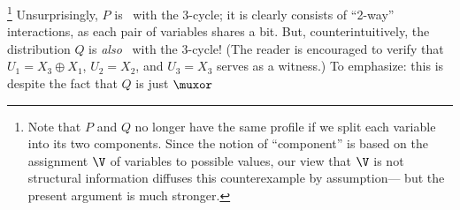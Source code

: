 \footnote{%
    Note that $P$ and $Q$ no longer have the same profile if we split each variable into its two components.  
    Since the notion of ``component'' is based on
    the assignment $\V$ of variables to possible values,
    our view that $\V$ is {not} structural information
    diffuses this counterexample by assumption---%
    but the present argument is much stronger.
}
    Unsurprisingly, $P$ is \cible\ with the 3-cycle;
    it is clearly consists of ``2-way'' interactions, as each pair of variables shares a bit.
But, 
counterintuitively, 
the distribution $Q$ is \emph{also} \cible\ with the 3-cycle!
(The reader is encouraged to verify that 
    $U_1 = X_3 \oplus X_1$, $U_2 = X_2$, and $U_3 = X_3$
    serves as a witness.) 
To emphasize: this is despite the fact that $Q$ 
is just 
    $\muxor$
